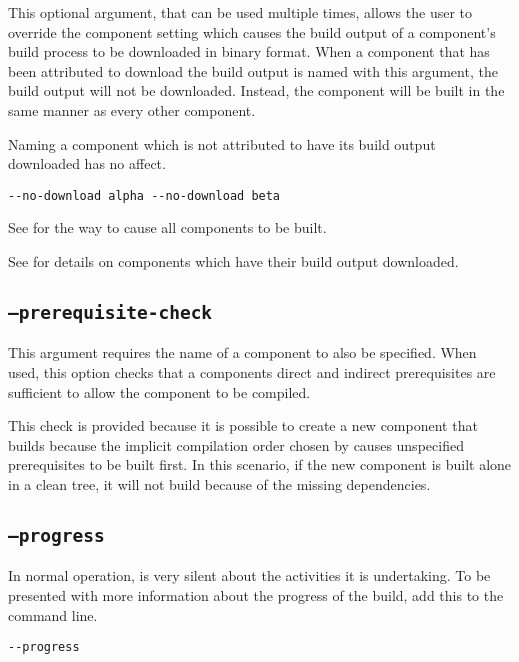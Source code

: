 This optional argument, that can be used multiple times, allows the
user to override the component setting which causes the build output
of a component's build process to be downloaded in binary format.
When a component that has been attributed to download the build output
is named with this argument, the build output will not be downloaded.
Instead, the component will be built in the same manner as every other
component.

Naming a component which is not attributed to have its build output
downloaded has no affect.

\begin{verbatim}
--no-download alpha --no-download beta
\end{verbatim}

See  for the way to
cause all components to be built.

See  for details on components
which have their build output downloaded.

\subsection{\texttt{--prerequisite-check}}\label{usinglmsbw:prerequisite-check}

This argument requires the name of a component to also be specified.
When used, this option checks that a components direct and indirect
prerequisites are sufficient to allow the component to be compiled.

This check is provided because it is possible to create a new
component that builds because the implicit compilation order chosen by
\make causes unspecified prerequisites to be built first.  In this
scenario, if the new component is built alone in a clean tree, it will
not build because of the missing dependencies.

\subsection{\texttt{--progress}}\label{usinglmsbw:progress}

In normal operation, \lmsbw is very silent about the activities it is
undertaking.  To be presented with more information about the progress
of the build, add this to the command line.

\begin{verbatim}
--progress
\end{verbatim}

